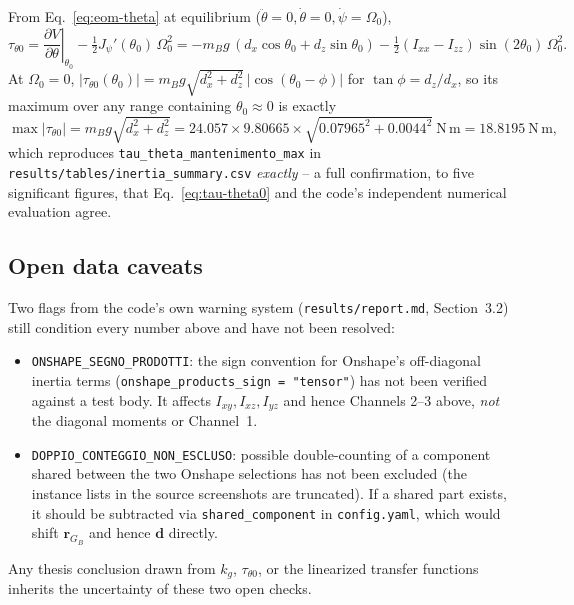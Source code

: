 \documentclass[11pt,a4paper]{article}
\numberwithin{equation}{section}
\newcommand{\bs}[1]{\boldsymbol{#1}}
\begin{document}
From Eq.~\eqref{eq:eom-theta} at equilibrium ($\ddot\theta=0,\dot\theta=0,\dot\psi=\Omega_0$),
\begin{equation}
\tau_{\theta0} = \left.\frac{\partial V}{\partial\theta}\right|_{\theta_0} - \tfrac12 J_\psi'(\theta_0)\,\Omega_0^2
= -m_B g\,(d_x\cos\theta_0+d_z\sin\theta_0) - \tfrac12(I_{xx}-I_{zz})\sin(2\theta_0)\,\Omega_0^2 .
\label{eq:tau-theta0}
\end{equation}
At $\Omega_0=0$, $|\tau_{\theta0}(\theta_0)| = m_Bg\sqrt{d_x^2+d_z^2}\,\big|\cos(\theta_0-\phi)\big|$ for $\tan\phi = d_z/d_x$, so its maximum over any range containing $\theta_0\approx0$ is exactly
\begin{equation}
\max|\tau_{\theta0}| = m_B g \sqrt{d_x^2+d_z^2} = 24.057 \times 9.80665 \times \sqrt{0.07965^2+0.0044^2}\ \mathrm{N\,m} = 18.8195\ \mathrm{N\,m},
\end{equation}
which reproduces \texttt{tau\_theta\_mantenimento\_max} in \texttt{results/tables/inertia\_summary.csv} \emph{exactly} -- a full confirmation, to five significant figures, that Eq.~\eqref{eq:tau-theta0} and the code's independent numerical evaluation agree.

\subsection{Open data caveats}

Two flags from the code's own warning system (\texttt{results/report.md}, Section~3.2) still condition every number above and have not been resolved:
\begin{itemize}
\item \texttt{ONSHAPE\_SEGNO\_PRODOTTI}: the sign convention for Onshape's off-diagonal inertia terms (\texttt{onshape\_products\_sign = "tensor"}) has not been verified against a test body. It affects $I_{xy},I_{xz},I_{yz}$ and hence Channels 2--3 above, \emph{not} the diagonal moments or Channel~1.
\item \texttt{DOPPIO\_CONTEGGIO\_NON\_ESCLUSO}: possible double-counting of a component shared between the two Onshape selections has not been excluded (the instance lists in the source screenshots are truncated). If a shared part exists, it should be subtracted via \texttt{shared\_component} in \texttt{config.yaml}, which would shift $\bs r_{G_B}$ and hence $\bs d$ directly.
\end{itemize}
Any thesis conclusion drawn from $k_g$, $\tau_{\theta0}$, or the linearized transfer functions inherits the uncertainty of these two open checks.
\end{document}
